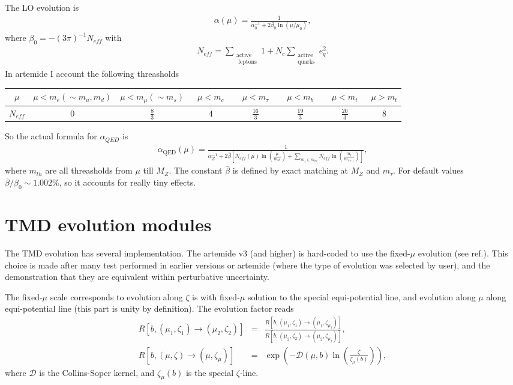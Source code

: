 \documentclass[prd,nofootinbib,eqsecnum,final]{revtex4}
\renewcommand{\(}{\left(}
\renewcommand{\)}{\right)}
\renewcommand{\[}{\left[}
\renewcommand{\]}{\right]}
\begin{document}
The LO evolution is
\begin{eqnarray}
\alpha(\mu)=\frac{1}{\alpha_0^{-1}+2\beta_0 \ln(\mu/\mu_0)},
\end{eqnarray}
where $\beta_0=-(3\pi)^{-1}N_{eff}$ with 
\begin{eqnarray}
N_{eff}=\sum_{\substack{\text{active}\\\text{ leptons}}}1+N_c\sum_{\substack{\text{active}\\\text{quarks}}}e_q^2.
\end{eqnarray}
In artemide I account the following threasholds
\begin{center}
\begin{tabular}{c||c|c|c|c|c|c|c|}
$\mu$   & $\mu<m_e(\sim m_u,m_d)$ & $\mu<m_\mu(\sim m_s)$ & ~$\mu<m_c$~ & ~$\mu<m_\tau$~ & ~$\mu<m_b$~ & ~$\mu<m_t$~ & $\mu>m_t$
\\\hline
$N_{eff}$& 0 & $\frac{8}{3}$ & $4$ & $\frac{16}{3}$ & $\frac{19}{3}$ & $\frac{20}{3}$ & $8$ 
\end{tabular}
\end{center}
So the actual formula for $\alpha_{QED}$ is
\begin{eqnarray}
\alpha_{\text{QED}}(\mu)=\frac{1}{\alpha_Z^{-1}+2\bar \beta\[N_{eff}(\mu)\ln\(\frac{\mu}{m_{th}}\)+\sum_{m_i\in m_{th}} N_{eff}\ln\(\frac{m_{i}}{m_{i+1}}\)\]},
\end{eqnarray}
where $m_{th}$ are all threasholds from $\mu$ till $M_Z$. The constant $\bar \beta$ is defined by exact matching at $M_Z$ and $m_\tau$. For default values $\bar\beta/\beta_0\sim 1.002\%$, so it accounts for really tiny effects.

\newpage

\section{TMD evolution modules}

The TMD evolution has several implementation. The artemide v3 (and higher) is hard-coded to use the fixed-$\mu$ evolution (see ref.\cite{Scimemi:2018xaf}). This choice is made after many test performed in earlier versions or artemide (where the type of evolution was selected by user), and the demonstration that they are equivalent within perturbative uncertainty.

The fixed-$\mu$ scale corresponds to evolution along $\zeta$ is with fixed-$\mu$ solution to the special equi-potential line, and evolution along $\mu$ along equi-potential line (this part is unity by definition). The evolution factor reads
\begin{eqnarray}
R[b,(\mu_1,\zeta_1)\to(\mu_2,\zeta_2)]&=&\frac{R[b,(\mu_1,\zeta_1)\to(\mu_1,\zeta_{\mu_1})]}{R[b,(\mu_2,\zeta_2)\to(\mu_2,\zeta_{\mu_2})]},
\\
R[b,(\mu,\zeta)\to(\mu,\zeta_{\mu})]&=&\exp\(-\mathcal{D}(\mu,b)\ln\(\frac{\zeta}{\zeta_\mu(b)}\)\),
\end{eqnarray}
where $\mathcal{D}$ is the Collins-Soper kernel, and $\zeta_\mu(b)$ is the special $\zeta$-line.
\end{document}
